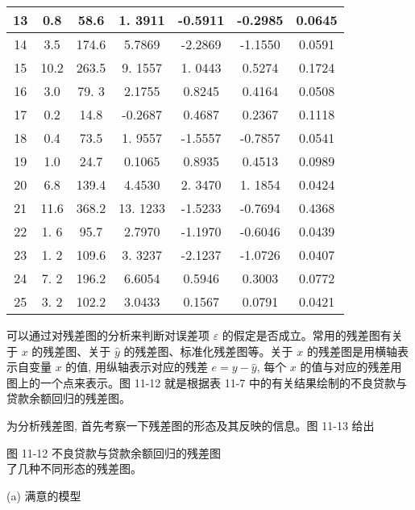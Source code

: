 \documentclass[10pt]{article}
\begin{document}
\begin{CJK*}{UTF8}{bsmi}
\begin{center}
\begin{tabular}{|c|c|c|c|c|c|c|}
\hline
13 & 0.8 & 58.6 & 1. 3911 & -0.5911 & -0.2985 & 0.0645 \\
\hline
14 & 3.5 & 174.6 & 5.7869 & -2.2869 & -1.1550 & 0.0591 \\
\hline
15 & 10.2 & 263.5 & 9. 1557 & 1. 0443 & 0.5274 & 0.1724 \\
\hline
16 & 3.0 & 79. 3 & 2.1755 & 0.8245 & 0.4164 & 0.0508 \\
\hline
17 & 0.2 & 14.8 & -0.2687 & 0.4687 & 0.2367 & 0.1118 \\
\hline
18 & 0.4 & 73.5 & 1. 9557 & -1.5557 & -0.7857 & 0.0541 \\
\hline
19 & 1.0 & 24.7 & 0.1065 & 0.8935 & 0.4513 & 0.0989 \\
\hline
20 & 6.8 & 139.4 & 4.4530 & 2. 3470 & 1. 1854 & 0.0424 \\
\hline
21 & 11.6 & 368.2 & 13. 1233 & -1.5233 & -0.7694 & 0.4368 \\
\hline
22 & 1. 6 & 95.7 & 2.7970 & -1.1970 & -0.6046 & 0.0439 \\
\hline
23 & 1. 2 & 109.6 & 3. 3237 & -2.1237 & -1.0726 & 0.0407 \\
\hline
24 & 7. 2 & 196.2 & 6.6054 & 0.5946 & 0.3003 & 0.0772 \\
\hline
25 & 3. 2 & 102.2 & 3.0433 & 0.1567 & 0.0791 & 0.0421 \\
\hline
\end{tabular}
\end{center}

可以通过对残差图的分析来判断对误差项 $\varepsilon$ 的假定是否成立。常用的残差图有关于 $x$ 的残差图、关于 $\hat{y}$ 的残差图、标准化残差图等。关于 $x$ 的残差图是用横轴表示自变量 $x$ 的值, 用纵轴表示对应的残差 $e=y-\hat{y}$, 每个 $x$ 的值与对应的残差用图上的一个点来表示。图 11-12 就是根据表 11-7 中的有关结果绘制的不良贷款与贷款余额回归的残差图。

为分析残差图, 首先考察一下残差图的形态及其反映的信息。图 11-13 给出

\begin{center}
\end{center}

图 11-12 不良贷款与贷款余额回归的残差图\\
了几种不同形态的残差图。

\begin{center}
\end{center}

(a) 满意的模型

\begin{center}
\end{center}


\end{CJK*}
\end{document}
